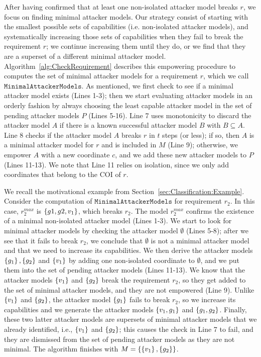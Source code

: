 After having confirmed that at least one non-isolated attacker model breaks $r$, we focus on finding minimal attacker models. Our strategy consist of starting with the smallest possible sets of capabilities (i.e. non-isolated attacker models), and systematically increasing those sets of capabilities when they fail to break the requirement $r$; we continue increasing them until they do, or we find that they are a superset of a different minimal attacker model. Algorithm~\ref{alg:CheckRequirement} describes this empowering procedure to computes the set of minimal attacker models for a requirement $r$, which we call $\mathtt{MinimalAttackerModels}$. As mentioned, we first check to see if a minimal attacker model exists (Lines 1-3); then we start evaluating attacker models in an orderly fashion by always choosing the least capable attacker model in the set of pending attacker models $P$ (Lines 5-16). Line 7 uses monotonicity to discard the attacker model $A$ if there is a known successful attacker model $B$ with $B\subseteq A$. Line 8 checks if the attacker model $A$ breaks $r$ in $t$ steps (or less); if so, then $A$ is a minimal attacker model for $r$ and is included in $M$ (Line 9); otherwise, we empower $A$ with a new coordinate $c$, and we add these new attacker models to $P$ (Lines 11-13). We note that Line 11 relies on isolation, since we only add coordinates that belong to the COI of $r$.

\begin{example}
We recall the motivational example from Section~\ref{sec:Classification:Example}. 
Consider the computation of $\mathtt{MinimalAttackerModels}$ for requirement $r_2$. In this case, $r_2^{max}$ is $\left\{g1,g2,v_1\right\}$, which breaks $r_2$. The model $r_2^{max}$ confirms the existence of a minimal non-isolated attacker model (Lines 1-3). We start to look for minimal attacker models by checking the attacker model $\emptyset$ (Lines 5-8); after we see that it fails to break $r_2$, we conclude that $\emptyset$ is not a minimal attacker model and that we need to increase its capabilities. We then derive the attacker models $\left\{g_1\right\}, \left\{g_2\right\}$ and $\left\{v_1\right\}$ by adding one non-isolated coordinate to $\emptyset$, and we put them into the set of pending attacker models (Lines 11-13). We know that the attacker models $\left\{v_1\right\}$ and $\left\{g_2\right\}$ break the requirement $r_2$, so they get added to the set of minimal attacker models, and they are not empowered (Line 9). Unlike $\left\{v_1\right\}$ and $\left\{g_2\right\}$, the attacker model $\left\{g_1\right\}$ fails to break $r_2$, so we increase its capabilities and we generate the attacker models $\left\{v_1, g_1\right\}$ and $\left\{g_1, g_2\right\}$. Finally, these two latter attacker models are supersets of minimal attacker models that we already identified, i.e., $\left\{v_1\right\}$ and $\left\{g_2\right\}$; this causes the check in Line 7 to fail, and they are dismissed from the set of pending attacker models as they are not minimal. The algorithm finishes with $M=\left\{\left\{v_1\right\}, \left\{g_2\right\}\right\}$.
\end{example}


